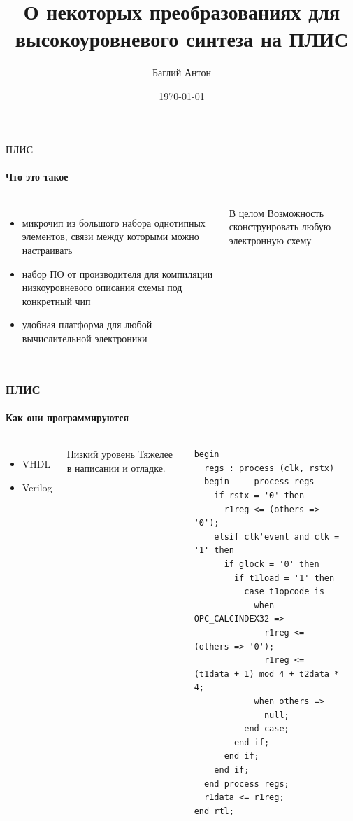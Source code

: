 \documentclass{beamer}              %
\title{О некоторых преобразованиях для высокоуровневого синтеза на ПЛИС}
\subtitle{}
\date{\today}
\author{Баглий Антон}
\institute{\url{sfedu.ru}}
\begin{document}
\maketitle


\begin{frame}{ПЛИС}
  \framesubtitle{Что это такое}
   
  \begin{columns}
      \begin{itemize}
        \item микрочип из большого набора однотипных элементов, связи между которыми можно настраивать
        \item набор ПО от производителя для компиляции низкоуровневого описания схемы под конкретный чип
        \item удобная платформа для любой вычислительной электроники
      \end{itemize}

      \begin{block}{В целом}
         Возможность сконструировать любую электронную схему
      \end{block}
  \end{columns}		  
\end{frame}

\begin{frame}[fragile]
\frametitle{ПЛИС}
  \framesubtitle{Как они программируются}
  \begin{columns}
      \begin{itemize}
        \item VHDL
        \item Verilog
      \end{itemize}
      
      \begin{block}{Низкий уровень}
         Тяжелее в написании и отладке. 
      \end{block}

      
      
\begin{lstlisting}[frame=single]
begin
  regs : process (clk, rstx)
  begin  -- process regs
    if rstx = '0' then         
      r1reg <= (others => '0');
    elsif clk'event and clk = '1' then  
      if glock = '0' then
        if t1load = '1' then
          case t1opcode is
            when OPC_CALCINDEX32 =>
              r1reg <= (others => '0');
              r1reg <= (t1data + 1) mod 4 + t2data * 4;
            when others =>
              null;
          end case;
        end if;
      end if;
    end if;
  end process regs;
  r1data <= r1reg;
end rtl;
\end{lstlisting}
\label{clone_listing}
      
  \end{columns}
  
\end{frame}
\end{document}
